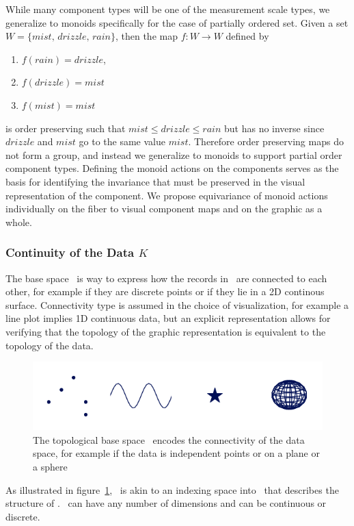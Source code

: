 \documentclass[../main.tex]{subfiles}
\begin{document}
While many component types will be one of the measurement scale types, we generalize to monoids specifically for the case of partially ordered set. Given a set $W=\{mist, \, drizzle, \, rain \}$, then the map $f: W\rightarrow W$ defined by 
\begin{enumerate}
    \item $f(rain) = drizzle$,
    \item  $f(drizzle) = mist$ 
    \item $f(mist) = mist$
\end{enumerate}
is order preserving such that $mist \leq drizzle \leq rain$ but has no inverse since $drizzle$ and $mist$ go to the same value $mist$. Therefore order preserving maps do not form a group, and instead we generalize to monoids to support partial order component types. Defining the monoid actions on the components serves as the basis for identifying the invariance\cite{kindlmann2014algebraic} that must be preserved in the visual representation of the component. We propose equivariance of monoid actions individually on the fiber to visual component maps and on the graphic as a whole.

\subsubsection{Continuity of the Data $K$} 
\label{sec:data_base}
The base space \dbase\ is way to express how the records in \dtotal\ are connected to each other, for example if they are discrete points or if they lie in a 2D continous surface. Connectivity type is assumed in the choice of visualization, for example a line plot implies 1D continuous data, but an explicit representation allows for verifying that the topology of the graphic representation is equivalent to the topology of the data.  

\begin{figure}[H]
    \includegraphics[width=1\textwidth]{figures/math/k_different_types.png}
    \caption{The topological base space \dbase\ encodes the connectivity of the data space, for example if the data is independent points or on a plane or a sphere}
    \label{fig:base_space_types}
\end{figure}
As illustrated in figure~\ref{fig:base_space_types}, \dbase\ is akin to an indexing space into \dtotal\ that describes the structure of \dtotal.  \dbase\ can have any number of dimensions and can be continuous or discrete. 
\end{document}
